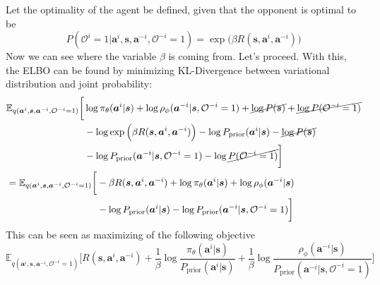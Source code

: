 Let the optimality of the agent be defined, given that the opponent is optimal to be  
\begin{equation}
    P(\mathcal{O}^i = 1 | \boldsymbol{a}^i, \boldsymbol{s}, \boldsymbol{a}^{-i}, \mathcal{O}^{-i} = 1) = \exp\Big( \beta R(\boldsymbol{s}, \boldsymbol{a}^i, \boldsymbol{a}^{-i}) \Big)
\end{equation}
Now we can see where the variable $\beta$ is coming from. Let's proceed. With this, the ELBO can be found by minimizing KL-Divergence between variational distribution and joint probability:
\begin{equation*}
    \begin{aligned}
        &\begin{aligned}[t]
            \mathbb{E}_{q(\boldsymbol{a}^i, \boldsymbol{s}, \boldsymbol{a}^{-i}, \mathcal{O}^{-i} = 1)} \bigg[ &\log \pi_{\theta} (\boldsymbol{a}^i | \boldsymbol{s}) + \log \rho_{\phi}(\boldsymbol{a}^{-i} | \boldsymbol{s}, \mathcal{O}^{-i} = 1) + \cancel{\log P(\boldsymbol{s})} + \cancel{\log P(\mathcal{O}^{-i} = 1)}  \\
            &-\log \exp\Big( \beta R(\boldsymbol{s}, \boldsymbol{a}^i, \boldsymbol{a}^{-i}) \Big) - \log P_{\text{prior}}(\boldsymbol{a}^i | \boldsymbol{s}) - \cancel{\log  P(\boldsymbol{s})} \\
            &- \log P_{\text{prior}}(\boldsymbol{a}^{-i} | \boldsymbol{s}, \mathcal{O}^{-i} = 1) -\log \cancel{P(\mathcal{O}^{-i} = 1)} \bigg]
        \end{aligned} \\
        &= \begin{aligned}[t]
            \mathbb{E}_{q(\boldsymbol{a}^i, \boldsymbol{s}, \boldsymbol{a}^{-i}, \mathcal{O}^{-i} = 1)} \bigg[ &- \beta R(\boldsymbol{s}, \boldsymbol{a}^i, \boldsymbol{a}^{-i}) + \log \pi_{\theta} (\boldsymbol{a}^i | \boldsymbol{s}) + \log \rho_{\phi}(\boldsymbol{a}^{-i} | \boldsymbol{s}) \\
            &-\log P_{\text{prior}}(\boldsymbol{a}^i | \boldsymbol{s}) - \log P_{\text{prior}}(\boldsymbol{a}^{-i} | \boldsymbol{s}, \mathcal{O}^{-i} = 1) \bigg]
        \end{aligned}
    \end{aligned}
\end{equation*}
This can be seen as maximizing of the following objective 
\begin{equation}
    \mathbb{E}_{q(\boldsymbol{a}^i, \boldsymbol{s}, \boldsymbol{a}^{-i}, \mathcal{O}^{-i} = 1)} \bigg[ R(\boldsymbol{s}, \boldsymbol{a}^i, \boldsymbol{a}^{-i}) + \frac{1}{\beta} \log \frac{\pi_{\theta} (\boldsymbol{a}^i | \boldsymbol{s})}{P_{\text{prior}}(\boldsymbol{a}^i | \boldsymbol{s})}  + \frac{1}{\beta} \log \frac{\rho_{\phi}(\boldsymbol{a}^{-i} | \boldsymbol{s})}{P_{\text{prior}}(\boldsymbol{a}^{-i} | \boldsymbol{s}, \mathcal{O}^{-i} = 1)} \bigg]
\end{equation}
